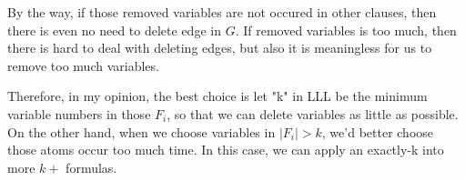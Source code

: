 By the way, if those removed variables  are not occured in other clauses, then there is even no need to delete edge in $G$. If removed variables is too much, then there is hard to deal with deleting edges, but also it is meaningless for us to remove too much variables. 


Therefore, in my opinion, the best choice is let "k" in LLL be the minimum variable numbers in those $F_i$, so that we can delete variables as little as possible. On the other hand, when we choose variables in $|F_i| > k$, we'd better choose those atoms occur too much time. In this case, we can apply an exactly-k into more $k+$ formulas.





















